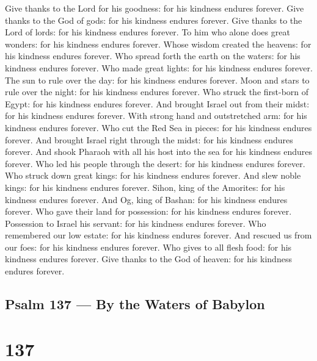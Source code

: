  Give thanks to the Lord for his goodness: for his kindness
endures forever.  Give thanks to the God of gods: for his
kindness endures forever.  Give thanks to the Lord of lords:
for his kindness endures forever.  To him who alone does
great wonders: for his kindness endures forever.  Whose
wisdom created the heavens: for his kindness endures forever.
 Who spread forth the earth on the waters: for his kindness
endures forever.  Who made great lights: for his kindness
endures forever.  The sun to rule over the day: for his
kindness endures forever.  Moon and stars to rule over the
night: for his kindness endures forever.  Who struck the
first-born of Egypt: for his kindness endures forever.  And
brought Israel out from their midst: for his kindness endures forever.
 With strong hand and outstretched arm: for his kindness
endures forever.  Who cut the Red Sea in pieces: for his
kindness endures forever.  And brought Israel right through
the midst: for his kindness endures forever.  And shook
Pharaoh with all his host into the sea for his kindness endures forever.
 Who led his people through the desert: for his kindness
endures forever.  Who struck down great kings: for his
kindness endures forever.  And slew noble kings: for his
kindness endures forever.  Sihon, king of the Amorites: for
his kindness endures forever.  And Og, king of Bashan: for
his kindness endures forever.  Who gave their land for
possession: for his kindness endures forever.  Possession
to Israel his servant: for his kindness endures forever. 
Who remembered our low estate: for his kindness endures forever.
 And rescued us from our foes: for his kindness endures
forever.  Who gives to all flesh food: for his kindness
endures forever.  Give thanks to the God of heaven: for his
kindness endures forever.

\hypertarget{psalm-137-by-the-waters-of-babylon}{%
\subsection{Psalm 137 --- By the Waters of
Babylon}\label{psalm-137-by-the-waters-of-babylon}}

\hypertarget{section-136}{%
\section{137}\label{section-136}}

